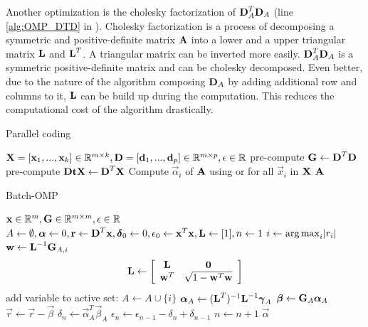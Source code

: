 Another optimization is the cholesky factorization of $\boldsymbol{\mathrm{D}}_A^T \boldsymbol{\mathrm{D}}_A$
(line \ref{alg:OMP_DTD} in ). Cholesky factorization is a
process of decomposing a symmetric and positive-definite matrix $\boldsymbol{\mathrm{A}}$ into
a lower and a upper triangular matrix $\boldsymbol{\mathrm{L}}$ and $\boldsymbol{\mathrm{L}}^T$. A triangular
matrix can be inverted more easily. 
$\boldsymbol{\mathrm{D}}_A^T \boldsymbol{\mathrm{D}}_A$ is a symmetric positive-definite matrix and can be
cholesky decomposed. Even better, due to the nature of the
algorithm composing $\boldsymbol{\mathrm{D}}_A$ by adding additional row and columns to it,
$\boldsymbol{\mathrm{L}}$ can be build up during the computation. This reduces the computational
cost of the algorithm drastically.

\begin{algorithm}[h]
\caption{Parallel coding}
\label{alg:parallel}
\begin{algorithmic}[1]
\REQUIRE $\boldsymbol{\mathrm{X}} =[\boldsymbol{\mathrm{x}}_1,...,\boldsymbol{\mathrm{x}}_k]  \in \mathbb{R}^{m \times k},
\boldsymbol{\mathrm{D}} =[\boldsymbol{\mathrm{d}}_1,...,\boldsymbol{\mathrm{d}}_p] \in
\mathbb{R}^{m\times p}, \epsilon \in \mathbb{R}$
\STATE pre-compute $\boldsymbol{\mathrm{G}} \gets \boldsymbol{\mathrm{D}}^T\boldsymbol{\mathrm{D}}$
\STATE pre-compute $\boldsymbol{\mathrm{DtX}} \gets \boldsymbol{\mathrm{D}}^T\boldsymbol{\mathrm{X}}$
\STATE Compute $\vec{\alpha}_i$ of $\boldsymbol{\mathrm{A}}$ using  or
 for all $\vec{x}_i$ in $\boldsymbol{\mathrm{X}}$
\ENDFOR
\RETURN $\boldsymbol{\mathrm{A}}$
\end{algorithmic}
\end{algorithm}

\begin{algorithm}[h]
\caption{Batch-OMP}
\label{alg:batchOMP}
\begin{algorithmic}[1]
\REQUIRE $\boldsymbol{\mathrm{x}} \in \mathbb{R}^{m}, \boldsymbol{\mathrm{G}}  \in
\mathbb{R}^{m\times m}, \epsilon \in \mathbb{R}$
\STATE $A \gets \emptyset,\boldsymbol{\mathrm{\alpha}} \gets 0,\boldsymbol{\mathrm{r}} \gets
\boldsymbol{\mathrm{D}}^T\boldsymbol{\mathrm{x}},\boldsymbol{\mathrm{\delta}}_0 \gets
0, \epsilon_0\gets \boldsymbol{\mathrm{x}}^T\boldsymbol{\mathrm{x}},\boldsymbol{\mathrm{L}}\gets[1],n\gets1$
\STATE $i \gets \operatorname*{arg\,max}_i\lvert r_i \rvert$
\STATE $\boldsymbol{\mathrm{w}} \gets \boldsymbol{\mathrm{L}}^{-1}\boldsymbol{\mathrm{G}}_{A,i}$
\STATE
\begin{align}
\boldsymbol{\mathrm{L}} \gets \left[
\begin{array}{ccc}
\boldsymbol{\mathrm{L}} & \boldsymbol{\mathrm{0}}\\
\boldsymbol{\mathrm{w}}^T & \sqrt{1-\boldsymbol{\mathrm{w}}^T\boldsymbol{\mathrm{w}}}
\end{array}
\right]
\end{align}
\ENDIF
\STATE add variable to active set: $A \gets A \cup \{ i\}$
\STATE $\boldsymbol{\mathrm{\alpha}}_A \gets (\boldsymbol{\mathrm{L}}^T)^{-1}\boldsymbol{\mathrm{L}}^{-1}\boldsymbol{\mathrm{\gamma}}_A$
\STATE $\boldsymbol{\mathrm{\beta}} \gets \boldsymbol{\mathrm{G}}_A\boldsymbol{\mathrm{\alpha}}_A$
\STATE $\vec{r} \gets \vec{r}-\vec{\beta}$
\STATE $\delta_{n} \gets \vec{\alpha}_A^T\vec{\beta}_A$
\STATE $\epsilon_n \gets \epsilon_{n-1} - \delta_n + \delta_{n-1}$
\STATE $n \gets n+1$
\ENDWHILE
\RETURN $\vec{\alpha}$
\end{algorithmic}
\end{algorithm}

